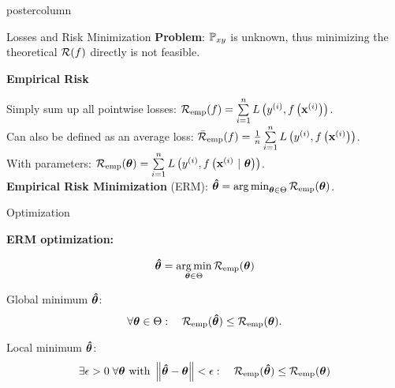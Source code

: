 \documentclass{beamer}
\begin{document}
\begin{frame}[fragile]{}
\begin{columns}
\begin{column}{.31\textwidth}
\begin{beamercolorbox}[center]{postercolumn}
\begin{minipage}{.98\textwidth}
{\begin{myblock}{Losses and Risk Minimization}
  \textbf{Problem}: $\mathbb{P}_{xy}$ is unknown, thus minimizing the theoretical $\mathcal{R}(f)$ directly is not feasible.

  \begin{codebox}
  \textbf{Empirical Risk}
  \end{codebox}
  Simply sum up all pointwise losses: $ \mathcal{R}_{\text{emp}}(f) = \sum\limits_{i=1}^n L\left(y^{(i)}, f\left(\mathbf{x}^{(i)}\right)\right) $.\\
  Can also be defined as an average loss: $ \bar{\mathcal{R}}_{\text{emp}}(f) = \frac{1}{n}\sum\limits_{i=1}^n L\left(y^{(i)}, f\left(\mathbf{x}^{(i)}\right)\right) $.\\
  With parameters: $\mathcal{R}_{\text{emp}}(\bm{\theta}) = \sum\limits_{i=1}^n L\left(y^{(i)}, f\left(\mathbf{x}^{(i)} ~|~ \bm{\theta}\right)\right)$.\\
  \textbf{Empirical Risk Minimization} (ERM): $\bm{\hat\theta} = \mathop{\mathrm{arg\,min}}_{\bm{\theta} \in \Theta} \mathcal{R}_{\text{emp}}(\bm{\theta})$.

  \end{myblock}
  
  \begin{myblock}{Optimization}

  \begin{codebox} 
  \textbf{ERM optimization:}
  \end{codebox}
  $$\bm{\hat\theta}  = \mathop{\mathrm{arg\,min}}_{\bm{\theta} \in \Theta} \mathcal{R}_{\text{emp}}(\bm{\theta}) $$
  
  Global minimum $\bm{\hat\theta}$: 
  \[
  \forall \bm{\theta} \in \Theta :\quad \mathcal{R}_{\text{emp}}(\bm{\hat\theta}) \leq \mathcal{R}_{\text{emp}}(\bm{\theta}) .
  \]

  Local minimum $\bm{\hat\theta}$:
  \[
  \exists \epsilon > 0\; \forall \bm{\theta} \text{ with } \left\Vert\bm{\hat\theta} - \bm{\theta}\right\Vert < \epsilon: \quad \mathcal{R}_{\text{emp}}(\bm{\hat\theta}) \leq \mathcal{R}_{\text{emp}}(\bm{\theta})
  \]

  \end{myblock}
  }
  
  \end{minipage}
  \end{beamercolorbox}
  \end{column}
  
  
  
\end{columns}
\end{frame}
\end{document}
